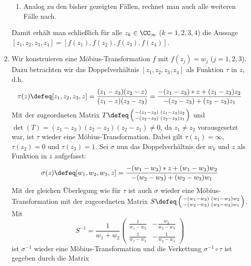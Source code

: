 \begin{exercisePage}
\begin{enumerate}[label=(zu \alph*), leftmargin=*]
\begin{enumerate}[label=(\roman*), leftmargin=*]
			\item Analog zu den bisher gezeigten Fällen, rechnet man auch alle weiteren Fälle nach. 
		\end{enumerate}
		Damit erhält man schließlich für alle $z_k \in \CC_\infty$ ($k=1,2,3,4$) die Aussage $[z_1, z_2, z_3, z_4] = [f(z_1), f(z_2), f(z_3), f(z_4)]$.
		
		\item Wir konstruieren eine Möbius-Transformation $f$ mit $f(z_j) = w_j$ ($j=1,2,3$). Dazu betrachten wir das Doppelverhältnis $[z_1, z_2, z_3, z_4]$ als Funktion $\tau$ in $z$, d.h.
		\begin{equation*}
			\tau(z) \defeq [z_1, z_2, z_3, z] = \frac{(z_1 - z_3)(z_2 - z)}{(z_1 - z) (z_2 - z_3)} = \frac{-(z_1 - z_3) * z + (z_1 - z_3) z_2}{-(z_2 - z_3) + (z_2 - z_3) z_1}
		\end{equation*}
		Mit der zugeordneten Matrix $T \defeq \left( \begin{smallmatrix}
		-(z_1 - z_3) & (z_1 - z_3) z_2 \\
		-(z_2 - z_3) & (z_2 - z_3) z_1
		\end{smallmatrix} \right)$ und $\det(T) = (z_1 - z_3) (z_2 - z_3) (z_2 - z_1) \neq 0$, da $z_1 \neq z_2$ vorausgesetzt war, ist $\tau$ wieder eine Möbius-Transformation.
		Dabei gilt $\tau(z_1) = \infty$, $\tau(z_2) = 0$ und $\tau(z_3) = 1$. 
		Sei $\sigma$ nun das Doppelverhältnis der $w_k$ und $z$ als Funktion in $z$ aufgefasst:
		\begin{equation*}
			\sigma(z) \defeq [w_1, w_2, w_3, z] = \frac{-(w_1 - w_3) * z + (w_1 - w_3) w_2}{-(w_2 - w_3) + (w_2 - w_3) w_1}
		\end{equation*}
		Mit der gleichen Überlegung wie für $\tau$ ist auch $\sigma$ wieder eine Möbius-Transformation mit der zugeordneten Matrix $S \defeq \left( \begin{smallmatrix}
		-(w_1 - w_3) & (w_1 - w_3) w_2 \\
		-(w_2 - w_3) & (w_2 - w_3) w_1
		\end{smallmatrix} \right)$.
		Mit 
		\begin{equation*}
			S^{-1} = \frac{1}{w_1 + w_2}
			\begin{pmatrix}
				\frac{1}{w_1 - w_3} & -\frac{w_2}{w_2 - w_3} \\
				\frac{1}{w_1 - w_3} & -\frac{1}{w_2 - w_3}
			\end{pmatrix}
		\end{equation*}
		ist $\sigma^{-1}$ wieder eine Möbius-Transformation und die Verkettung $\sigma^{-1} \circ \tau$ ist gegeben durch die Matrix

\end{enumerate}
\end{exercisePage}
